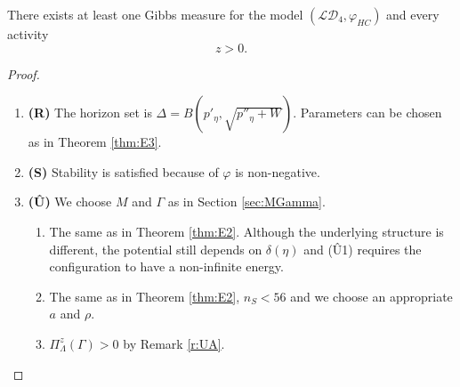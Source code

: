 \begin{theorem}\label{thm:E4}
	There exists at least one Gibbs measure for the model $(\mathcal {LD}_4,\varphi_{HC})$ and every activity $$z>0.$$
\end{theorem}
\begin{proof}
\begin{enumerate}[]
	\item \textbf{(R)} The horizon set is $\Delta = B(p'_\eta,\sqrt{p''_\eta +W})$. Parameters can be chosen as in Theorem \ref{thm:E3}. 
	\item \textbf{(S)} Stability is satisfied because of $\varphi$ is non-negative.
	\item \textbf{(\^U)} We choose $M$ and $\Gamma$ as in Section \ref{sec:MGamma}.
		\begin{enumerate}[(U1)]
			\item The same as in Theorem \ref{thm:E2}. Although the underlying structure is different, the potential still depends on $\delta(\eta)$ and (\^U1) requires the configuration to have a non-infinite energy.
			\item The same as in Theorem \ref{thm:E2}, $n_S<56$ and we choose an appropriate $a$ and $\rho$.
			\item $\Pi^z_\Lambda(\Gamma)>0$ by Remark \ref{r:UA}.
		\end{enumerate}
\end{enumerate}
\end{proof}




